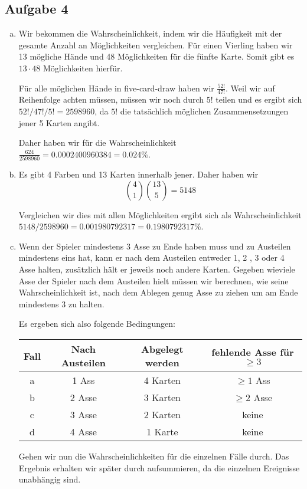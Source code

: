 \subsection*{Aufgabe 4}
\begin{enumerate}[a)]
  \item Wir bekommen die Wahrscheinlichkeit, indem wir die Häufigkeit mit der gesamte Anzahl an Möglichkeiten vergleichen. Für einen Vierling haben wir 13 mögliche Hände und 48 Möglichkeiten für die fünfte Karte. Somit gibt es $13 \cdot 48$ Möglichkeiten hierfür.

  Für alle möglichen Hände in five-card-draw haben wir $\frac{52!}{47!}$. Weil wir auf Reihenfolge achten müssen, müssen wir noch durch $5!$ teilen und es ergibt sich $52! / 47! / 5! = 2 598 960$, da $5!$ die tatsächlich möglichen Zusammensetzungen jener 5 Karten angibt.

  Daher haben wir für die Wahrscheinlichkeit $\frac{624}{2 598 960} = 0.0002400960384 = 0.024 \%$.

  \item Es gibt 4 Farben und 13 Karten innerhalb jener. Daher haben wir \[ \binom{4}{1} \binom{13}{5} = 5148 \]

  Vergleichen wir dies mit allen Möglichkeiten ergibt sich als Wahrscheinlichkeit $5148 / 2598960=0.001980792317 = 0.1980792317 \%$.

  \item Wenn der Spieler mindestens 3 Asse zu Ende haben muss und zu Austeilen mindestens eins hat, kann er nach dem Austeilen entweder 1, 2 , 3 oder 4 Asse halten, zusätzlich hält er jeweils noch andere Karten. Gegeben wieviele Asse der Spieler nach dem Austeilen hielt müssen wir berechnen, wie seine Wahrscheinlichkeit ist, nach dem Ablegen genug Asse zu ziehen um am Ende mindestens 3 zu halten.

  Es ergeben sich also folgende Bedingungen:

  \begin{tabular}{c c c c}
    Fall & Nach Austeilen & Abgelegt werden & fehlende Asse für $\geq 3$\\
    \hline
    a & 1 Ass & 4 Karten & $\geq 1$ Ass \\
    b & 2 Asse & 3 Karten & $\geq 2$ Asse \\
    c & 3 Asse & 2 Karten & keine \\
    d & 4 Asse & 1 Karte & keine \\
  \end{tabular}

  Gehen wir nun die Wahrscheinlichkeiten für die einzelnen Fälle durch. Das Ergebnis erhalten wir später durch aufsummieren, da die einzelnen Ereignisse unabhängig sind.


\end{enumerate}
